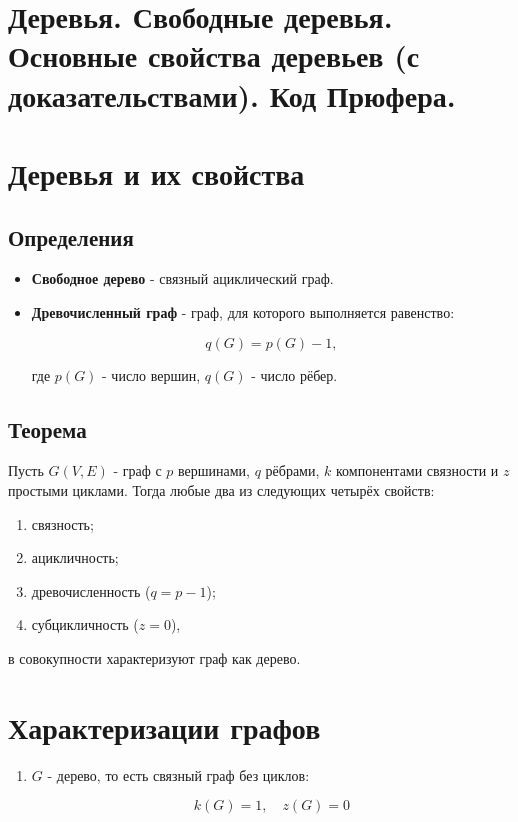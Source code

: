 {
	\section{Деревья. Свободные деревья. Основные свойства деревьев (с доказательствами).
Код Прюфера.}

\section*{Деревья и их свойства}

\subsection*{Определения}

\begin{itemize}
  \item \textbf{Свободное дерево} - связный ациклический граф.
  \item \textbf{Древочисленный граф} - граф, для которого выполняется равенство:
  

\[
  q(G) = p(G) - 1,
  \]


  где $p(G)$ - число вершин, $q(G)$ - число рёбер.
\end{itemize}

\subsection*{Теорема}

Пусть $G(V, E)$ - граф с $p$ вершинами, $q$ рёбрами, $k$ компонентами связности и $z$ простыми циклами.  
Тогда любые два из следующих четырёх свойств:
\begin{enumerate}
  \item связность;
  \item ацикличность;
  \item древочисленность ($q = p - 1$);
  \item субцикличность ($z = 0$),
\end{enumerate}
в совокупности характеризуют граф как дерево.

\section*{Характеризации графов}

\begin{enumerate}
  \item $G$ - дерево, то есть связный граф без циклов:  
  

\[
  k(G) = 1,\quad z(G) = 0
  \]




\end{enumerate}}
